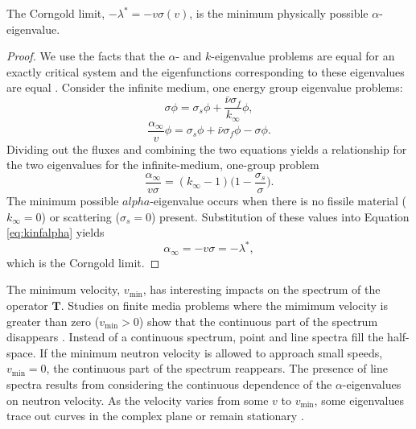 \begin{theorem}
	The Corngold limit, $-\lambda^{*} = -v\sigma(v)$, is the minimum physically possible $\alpha$-eigenvalue.
\end{theorem}

\begin{proof}
	We use the facts that the $\alpha$- and $k$-eigenvalue problems are equal for an exactly critical system and the eigenfunctions corresponding to these eigenvalues are equal \cite{velarde_analysis_1978}. Consider the infinite medium, one energy group eigenvalue problems:
	\begin{equation}
		\sigma \phi = \sigma_{s} \phi + \frac{\bar{\nu}\sigma_{f}}{k_{\infty}} \phi,
	\end{equation}
	\begin{equation}
		\frac{\alpha_{\infty}}{v}\phi = \sigma_{s} \phi + \bar{\nu}\sigma_{f}\phi - \sigma \phi.
	\end{equation}
Dividing out the fluxes and combining the two equations yields a relationship for the two eigenvalues for the infinite-medium, one-group problem \cite{kornreich_timeeigenvalue_2005}
\begin{equation}
	\frac{\alpha_{\infty}}{v\sigma} = (k_{\infty}-1) \bigg ( 1 - \frac{\sigma_{s}}{\sigma} \bigg ).
\label{eq:kinfalpha}
\end{equation}
The minimum possible $alpha$-eigenvalue occurs when there is no fissile material ($k_{\infty} = 0$) or scattering ($\sigma_{s} = 0$) present. Substitution of these values into Equation \ref{eq:kinfalpha} yields
\begin{equation}
	\alpha_{\infty} = - v \sigma = -\lambda^{*},
\end{equation}
which is the Corngold limit.
\end{proof}

The minimum velocity, $v_{\text{min}}$, has interesting impacts on the spectrum of the operator $\mathbf{T}$. Studies on finite media problems where the mimimum velocity is greater than zero ($v_{\text{min}} > 0$) show that the continuous part of the spectrum disappears \cite{jorgens_asymptotic_1958}. Instead of a continuous spectrum, point and line spectra fill the half-space. If the minimum neutron velocity is allowed to approach small speeds, $v_{\text{min}} = 0$, the continuous part of the spectrum reappears. The presence of line spectra results from considering the continuous dependence of the $\alpha$-eigenvalues on neutron velocity. As the velocity varies from some $v$ to $v_{\text{min}}$, some eigenvalues trace out curves in the complex plane or remain stationary \cite{larsen_spectrum_1974}.

